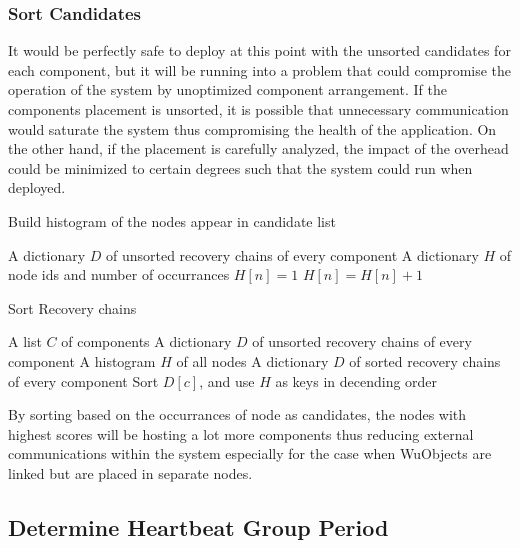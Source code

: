\subsubsection{Sort Candidates}

It would be perfectly safe to deploy at this point with the unsorted candidates
for each component, but it will be running into a problem that could compromise
the operation of the system by unoptimized component arrangement. If the
components placement is unsorted, it is possible that unnecessary communication
would saturate the system thus compromising the health of the application. On
the other hand, if the placement is carefully analyzed, the impact of the
overhead could be minimized to certain degrees such that the system could run
when deployed.

\begin{algorithm}
\caption{Build histogram of the nodes appear in candidate list}
\label{alg:build-histogram}
\begin{algorithmic}
\Require A dictionary $D$ of unsorted recovery chains of every component
\Ensure A dictionary $H$ of node ids and number of occurrances
      \State $H[n] = 1$
    \Else
      \State $H[n] = H[n] + 1$
    \EndIf
  \EndFor
\EndFor
\end{algorithmic}
\end{algorithm}

\begin{algorithm}
\caption{Sort Recovery chains}
\label{alg:sort-recovery-chain}
\begin{algorithmic}
\Require A list $C$ of components
\Require A dictionary $D$ of unsorted recovery chains of every component
\Require A histogram $H$ of all nodes
\Ensure A dictionary $D$ of sorted recovery chains of every component
  \State Sort $D[c]$, and use $H$ as keys in decending order
\EndFor
\end{algorithmic}
\end{algorithm}

By sorting based on the occurrances of node as candidates, the nodes with
highest scores will be hosting a lot more components thus reducing external
communications within the system especially for the case when WuObjects are
linked but are placed in separate nodes.

\subsection{Determine Heartbeat Group Period}

